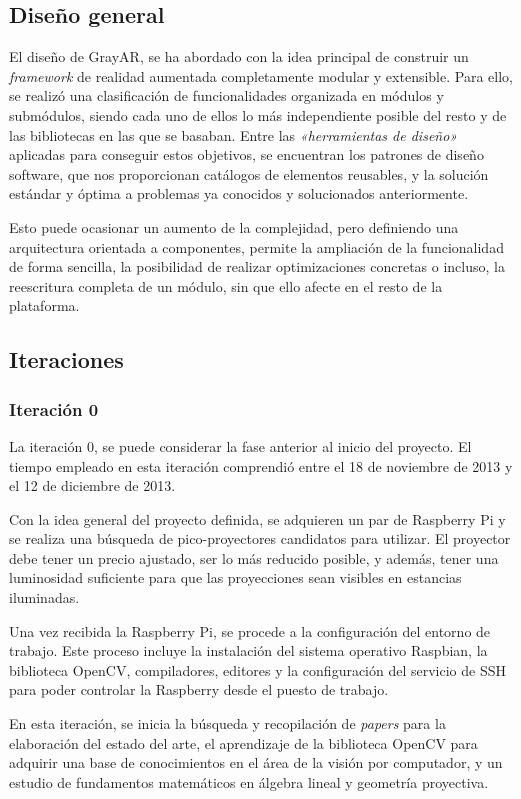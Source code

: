 \subsection{Diseño general}
El diseño de GrayAR, se ha abordado con la idea principal de construir un \textit{framework} de realidad aumentada completamente modular y extensible. Para ello, se realizó una clasificación de funcionalidades organizada en módulos y submódulos, siendo cada uno de ellos lo más independiente posible del resto y de las bibliotecas en las que se basaban. Entre las \textit{«herramientas de diseño»} aplicadas para conseguir estos objetivos, se encuentran los patrones de diseño software, que nos proporcionan catálogos de elementos reusables, y la solución estándar y óptima a problemas ya conocidos y solucionados anteriormente.

Esto puede ocasionar un aumento de la complejidad, pero definiendo una arquitectura orientada a componentes, permite la ampliación de la funcionalidad de forma sencilla, la posibilidad de realizar optimizaciones concretas o incluso, la reescritura completa de un módulo, sin que ello afecte en el resto de la plataforma. 

\subsection{Iteraciones}

\subsubsection{Iteración 0}
La iteración 0, se puede considerar la fase anterior al inicio del proyecto. El tiempo empleado en esta iteración comprendió entre el 18 de noviembre de 2013 y el 12 de diciembre de 2013.

Con la idea general del proyecto definida, se adquieren un par de Raspberry Pi y se realiza una búsqueda de pico-proyectores candidatos para utilizar. El proyector debe tener un precio ajustado, ser lo más reducido posible, y además, tener una luminosidad suficiente para que las proyecciones sean visibles en estancias iluminadas.  

Una vez recibida la Raspberry Pi, se procede a la configuración del entorno de trabajo. Este proceso incluye la instalación del sistema operativo Raspbian, la biblioteca OpenCV, compiladores, editores y la configuración del servicio de SSH para poder controlar la Raspberry desde el puesto de trabajo.

En esta iteración, se inicia la búsqueda y recopilación de \textit{papers} para la elaboración del estado del arte, el aprendizaje de la biblioteca OpenCV para adquirir una base de conocimientos en el área de la visión por computador, y un estudio de fundamentos matemáticos en álgebra lineal y geometría proyectiva.

